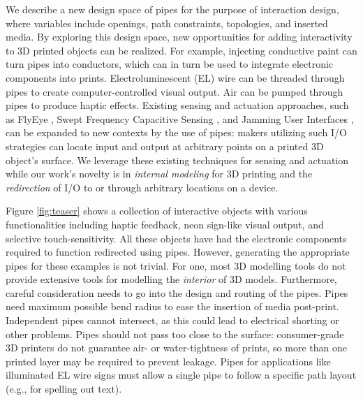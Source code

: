 We describe a new design space of pipes for the purpose of interaction design, where variables include openings, path constraints, topologies, and inserted media. By exploring this design space, new opportunities for adding interactivity to 3D printed objects can be realized. For example, injecting conductive paint can turn pipes into conductors, which can in turn be used to integrate electronic components into prints. Electroluminescent (EL) wire can be threaded through pipes to create computer-controlled visual output. Air can be pumped through pipes to produce haptic effects.  Existing sensing and actuation approaches, such as FlyEye \cite{Wimmer-flyeye}, Swept Frequency Capacitive Sensing \cite{Sato-touche}, and Jamming User Interfaces \cite{Follmer-jamming}, can be expanded to new contexts by the use of pipes: makers utilizing such I/O strategies can locate input and output at arbitrary points on a printed 3D object's surface.  We leverage these existing techniques for sensing and actuation while our work's novelty is in \emph{internal modeling} for 3D printing and the \emph{redirection} of I/O to or through arbitrary locations on a device.


Figure \ref{fig:teaser} shows a collection of interactive objects with various functionalities including haptic feedback, neon sign-like visual output, and selective touch-sensitivity.  All these objects have had the electronic components required to function redirected using pipes.  However, generating the appropriate pipes for these examples is not trivial.  For one, most 3D modelling tools do not provide extensive tools for modelling the  {\em interior} of 3D models. Furthermore, careful consideration needs to go into the design and routing of the pipes. Pipes need maximum possible bend radius to ease the insertion of media post-print.  Independent pipes cannot intersect, as this could lead to electrical shorting or other problems.  Pipes should not pass too close to the surface: consumer-grade 3D printers do not guarantee air- or water-tightness of prints, so more than one printed layer may be required to prevent leakage.  Pipes for applications like illuminated EL wire signs must allow a single pipe to follow a specific path layout (e.g., for spelling out text). 

